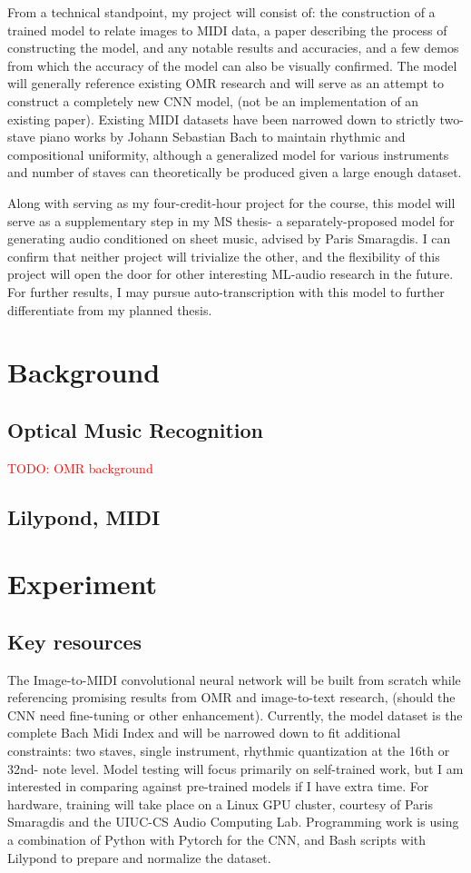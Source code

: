 \documentclass[review,sigconf]{acmart}
\newcommand{\todo}[1]{\textcolor{red}{TODO: #1}}
\begin{document}
From a technical standpoint, my project will consist of: the construction of a trained model to relate images to MIDI data, a paper describing the process of constructing the model, and any notable results and accuracies, and a few demos from which the accuracy of the model can also be visually confirmed. The model will generally reference existing OMR research and will serve as an attempt to construct a completely new CNN model, (not be an implementation of an existing paper). Existing MIDI datasets have been narrowed down to strictly two-stave piano works by Johann Sebastian Bach to maintain rhythmic and compositional uniformity, although a generalized model for various instruments and number of staves can theoretically be produced given a large enough dataset.

Along with serving as my four-credit-hour project for the course, this model will serve as a supplementary step in my MS thesis- a separately-proposed model for generating audio conditioned on sheet music, advised by Paris Smaragdis. I can confirm that neither project will trivialize the other, and the flexibility of this project will open the door for other interesting ML-audio research in the future. For further results, I may pursue auto-transcription with this model to further differentiate from my planned thesis.


\section{Background}
\subsection{Optical Music Recognition}
\todo{OMR background}

\subsection{Lilypond, MIDI}

\section{Experiment}
\subsection{Key resources}
The Image-to-MIDI convolutional neural network will be built from scratch while referencing promising results from OMR and image-to-text research, (should the CNN need fine-tuning or other enhancement). Currently, the model dataset is the complete Bach Midi Index and will be narrowed down to fit additional constraints: two staves, single instrument, rhythmic quantization at the 16th or 32nd- note level. Model testing will focus primarily on self-trained work, but I am interested in comparing against pre-trained models if I have extra time. For hardware, training will take place on a Linux GPU cluster, courtesy of Paris Smaragdis and the UIUC-CS Audio Computing Lab. Programming work is using a combination of Python with Pytorch for the CNN, and Bash scripts with Lilypond to prepare and normalize the dataset.
\end{document}
